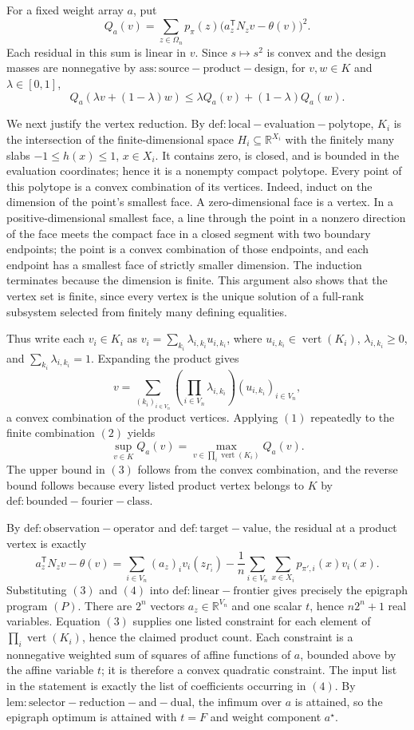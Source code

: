 For a fixed weight array \(a\), put
\[
Q_a(v)=\sum_{z\in\Omega_n}p_{\pi}(z)
\bigl(a_z^{\mathsf T}N_zv-\theta(v)\bigr)^2.
\]
Each residual in this sum is linear in \(v\). Since \(s\mapsto s^2\) is convex and the design masses are nonnegative by \(\mathrm{ass:source-product-design}\), for \(v,w\in K\) and \(\lambda\in[0,1]\),
\[
Q_a(\lambda v+(1-\lambda)w)
\le \lambda Q_a(v)+(1-\lambda)Q_a(w).
\tag{1}
\]

We next justify the vertex reduction. By \(\mathrm{def:local-evaluation-polytope}\), \(K_i\) is the intersection of the finite-dimensional space \(H_i\subseteq\mathbb R^{X_i}\) with the finitely many slabs \(-1\le h(x)\le1\), \(x\in X_i\). It contains zero, is closed, and is bounded in the evaluation coordinates; hence it is a nonempty compact polytope. Every point of this polytope is a convex combination of its vertices. Indeed, induct on the dimension of the point's smallest face. A zero-dimensional face is a vertex. In a positive-dimensional smallest face, a line through the point in a nonzero direction of the face meets the compact face in a closed segment with two boundary endpoints; the point is a convex combination of those endpoints, and each endpoint has a smallest face of strictly smaller dimension. The induction terminates because the dimension is finite. This argument also shows that the vertex set is finite, since every vertex is the unique solution of a full-rank subsystem selected from finitely many defining equalities.

Thus write each \(v_i\in K_i\) as \(v_i=\sum_{k_i}\lambda_{i,k_i}u_{i,k_i}\), where \(u_{i,k_i}\in\operatorname{vert}(K_i)\), \(\lambda_{i,k_i}\ge0\), and \(\sum_{k_i}\lambda_{i,k_i}=1\). Expanding the product gives
\[
v=\sum_{(k_i)_{i\in V_n}}
\left(\prod_{i\in V_n}\lambda_{i,k_i}\right)
(u_{i,k_i})_{i\in V_n},
\tag{2}
\]
a convex combination of the product vertices. Applying \((1)\) repeatedly to the finite combination \((2)\) yields
\[
\sup_{v\in K}Q_a(v)
=\max_{v\in\prod_i\operatorname{vert}(K_i)}Q_a(v).
\tag{3}
\]
The upper bound in \((3)\) follows from the convex combination, and the reverse bound follows because every listed product vertex belongs to \(K\) by \(\mathrm{def:bounded-fourier-class}\).

By \(\mathrm{def:observation-operator}\) and \(\mathrm{def:target-value}\), the residual at a product vertex is exactly
\[
a_z^{\mathsf T}N_zv-\theta(v)
=\sum_{i\in V_n}(a_z)_iv_i(z_{\Gamma_i})
-\frac1n\sum_{i\in V_n}\sum_{x\in X_i}p_{\pi',i}(x)v_i(x).
\tag{4}
\]
Substituting \((3)\) and \((4)\) into \(\mathrm{def:linear-frontier}\) gives precisely the epigraph program \((P)\). There are \(2^n\) vectors \(a_z\in\mathbb R^{V_n}\) and one scalar \(t\), hence \(n2^n+1\) real variables. Equation \((3)\) supplies one listed constraint for each element of \(\prod_i\operatorname{vert}(K_i)\), hence the claimed product count. Each constraint is a nonnegative weighted sum of squares of affine functions of \(a\), bounded above by the affine variable \(t\); it is therefore a convex quadratic constraint. The input list in the statement is exactly the list of coefficients occurring in \((4)\). By \(\mathrm{lem:selector-reduction-and-dual}\), the infimum over \(a\) is attained, so the epigraph optimum is attained with \(t=F\) and weight component \(a^{\star}\).

